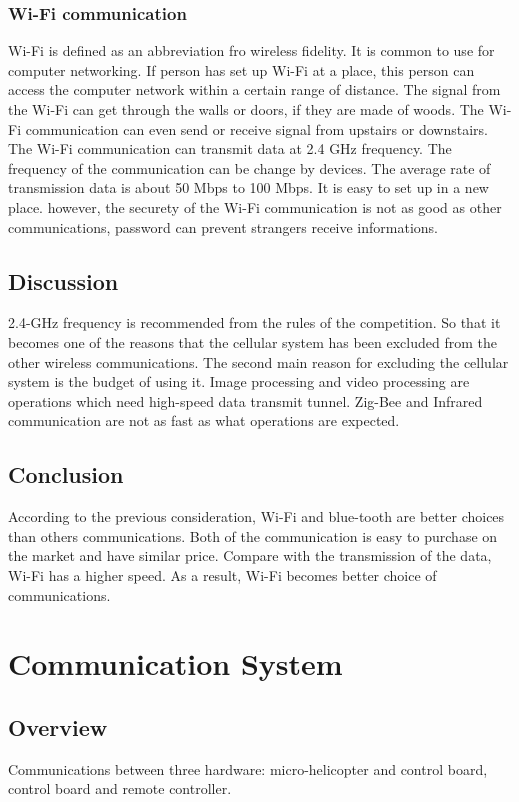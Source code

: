 \documentclass[onecolumn, draftclsnofoot,10pt, compsoc]{IEEEtran}
\begin{document}
\subsubsection{Wi-Fi communication}
Wi-Fi\cite{r3} is defined as an abbreviation fro wireless fidelity. It is common to use for computer networking.
If person has set up Wi-Fi at a place, this person can access the computer network within a certain range of distance.
The signal from the Wi-Fi can get through the walls or doors, if they are made of woods.
The Wi-Fi communication can even send or receive signal from upstairs or downstairs.
The Wi-Fi communication can transmit data at 2.4 GHz frequency. The frequency of the communication can be change by devices.
The average rate of transmission data is about 50 Mbps to 100 Mbps. It is easy to set up in a new place.
however, the securety of the Wi-Fi communication is not as good as other communications, password can prevent strangers receive informations.

\subsection{Discussion}
2.4-GHz frequency is recommended from the rules of the competition.
So that it becomes one of the reasons that the cellular system has been excluded from the other wireless communications.
The second main reason for excluding the cellular system is the budget of using it.
Image processing and video processing are operations which need high-speed data transmit tunnel.
Zig-Bee and Infrared communication are not as fast as what operations are expected.

\subsection{Conclusion}
According to the previous consideration, Wi-Fi and blue-tooth are better choices than others communications.
Both of the communication is easy to purchase on the market and have similar price.
Compare with the transmission of the data, Wi-Fi has a higher speed. As a result, Wi-Fi becomes better choice of communications.

\section{Communication System}

\subsection{Overview}
Communications between three hardware: micro-helicopter and control board, control board and remote controller.
\end{document}
